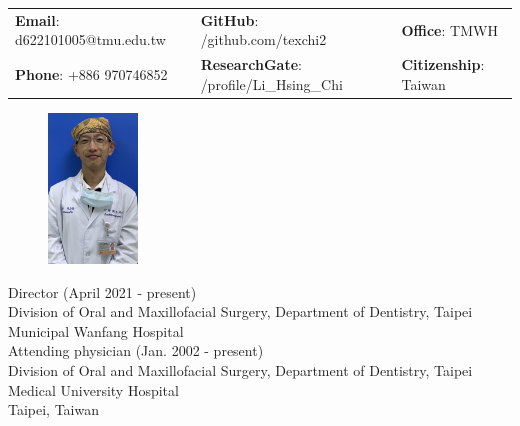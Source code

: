 \documentclass[letterpaper, 11pt]{article}
\begin{document}


\vspace{0.5cm} 
\begin{center}
\begin{tabular}{lll}
\textbf{Email}: d622101005@tmu.edu.tw      &
\hspace{0.2cm} \textbf{GitHub}: /github.com/texchi2    &
\hspace{0.2cm} 	\textbf{Office}: TMWH \\

\textbf{Phone}: +886 970746852   & 
\hspace{0.2cm} \textbf{ResearchGate}: 
/profile/Li\_Hsing\_Chi &
\hspace{0.2cm} \textbf{Citizenship}: Taiwan 
\end{tabular}
\end{center}

\begin{figure}
    \centering
    \includegraphics[height=40mm]{IMG_5507_Tex_portrait_TMWH.jpg}
\end{figure}

\noindent
Director (April 2021 - present)\\
Division of Oral and Maxillofacial Surgery, Department of Dentistry, Taipei Municipal Wanfang Hospital\\[4mm]
Attending physician (Jan. 2002 - present)\\
Division of Oral and Maxillofacial Surgery, Department of Dentistry,
Taipei Medical University Hospital\\
Taipei, Taiwan\\



\setlength{\tabcolsep}{8pt}
\end{document}

